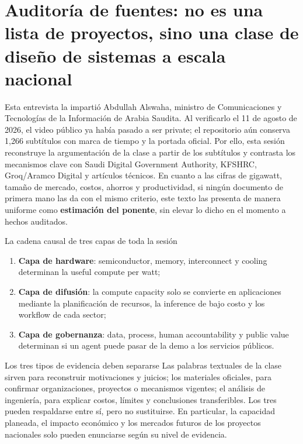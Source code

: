 \section{Auditoría de fuentes: no es una lista de proyectos, sino una clase de diseño de sistemas a escala nacional}

Esta entrevista la impartió Abdullah Alswaha, ministro de Comunicaciones y Tecnologías de la Información de Arabia Saudita. Al verificarlo el 11 de agosto de 2026, el video público ya había pasado a ser private; el repositorio aún conserva 1,266 subtítulos con marca de tiempo y la portada oficial. Por ello, esta sesión reconstruye la argumentación de la clase a partir de los subtítulos y contrasta los mecanismos clave con Saudi Digital Government Authority, KFSHRC, Groq/Aramco Digital y artículos técnicos. En cuanto a las cifras de gigawatt, tamaño de mercado, costos, ahorros y productividad, si ningún documento de primera mano las da con el mismo criterio, este texto las presenta de manera uniforme como \textbf{estimación del ponente}, sin elevar lo dicho en el momento a hechos auditados.

\begin{importantbox}{La cadena causal de tres capas de toda la sesión}
\begin{enumerate}
  \item \textbf{Capa de hardware}: semiconductor, memory, interconnect y cooling determinan la useful compute per watt;
  \item \textbf{Capa de difusión}: la compute capacity solo se convierte en aplicaciones mediante la planificación de recursos, la inference de bajo costo y los workflow de cada sector;
  \item \textbf{Capa de gobernanza}: data, process, human accountability y public value determinan si un agent puede pasar de la demo a los servicios públicos.
\end{enumerate}
\end{importantbox}

\begin{warningbox}{Los tres tipos de evidencia deben separarse}
Las palabras textuales de la clase sirven para reconstruir motivaciones y juicios; los materiales oficiales, para confirmar organizaciones, proyectos o mecanismos vigentes; el análisis de ingeniería, para explicar costos, límites y conclusiones transferibles. Los tres pueden respaldarse entre sí, pero no sustituirse. En particular, la capacidad planeada, el impacto económico y los mercados futuros de los proyectos nacionales solo pueden enunciarse según su nivel de evidencia.
\end{warningbox}

